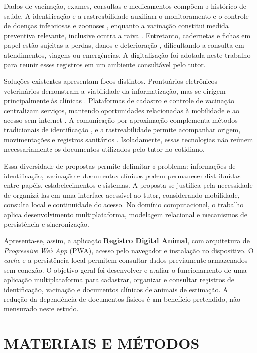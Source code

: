 \documentclass{UNESC}
\begin{document}
Dados de vacinação, exames, consultas e medicamentos compõem o histórico de saúde. A identificação e a rastreabilidade auxiliam o monitoramento e o controle de doenças infecciosas e zoonoses \cite{murphy2008}, enquanto a vacinação constitui medida preventiva relevante, inclusive contra a raiva \cite{MOUTINHO2017}. Entretanto, cadernetas e fichas em papel estão sujeitas a perdas, danos e deterioração \cite{BOLSON2022}, dificultando a consulta em atendimentos, viagens ou emergências. A digitalização foi adotada neste trabalho para reunir esses registros em um ambiente consultável pelo tutor.

Soluções existentes apresentam focos distintos. Prontuários eletrônicos veterinários demonstram a viabilidade da informatização, mas se dirigem principalmente às clínicas \cite{iskandar2023}. Plataformas de cadastro e controle de vacinação centralizam serviços, mantendo oportunidades relacionadas à mobilidade e ao acesso sem internet \cite{vieira2025}. A comunicação por aproximação complementa métodos tradicionais de identificação \cite{sartori2018}, e a rastreabilidade permite acompanhar origem, movimentações e registros sanitários \cite{zhao2020}. Isoladamente, essas tecnologias não reúnem necessariamente os documentos utilizados pelo tutor no cotidiano.

Essa diversidade de propostas permite delimitar o problema: informações de identificação, vacinação e documentos clínicos podem permanecer distribuídas entre papéis, estabelecimentos e sistemas. A proposta se justifica pela necessidade de organizá-las em uma interface acessível ao tutor, considerando mobilidade, consulta local e continuidade do acesso. No domínio computacional, o trabalho aplica desenvolvimento multiplataforma, modelagem relacional e mecanismos de persistência e sincronização.

Apresenta-se, assim, a aplicação \textbf{Registro Digital Animal}, com arquitetura de \textit{Progressive Web App} (PWA), acesso pelo navegador e instalação no dispositivo. O \textit{cache} e a persistência local permitem consultar dados previamente armazenados sem conexão. O objetivo geral foi desenvolver e avaliar o funcionamento de uma aplicação multiplataforma para cadastrar, organizar e consultar registros de identificação, vacinação e documentos clínicos de animais de estimação. A redução da dependência de documentos físicos é um benefício pretendido, não mensurado neste estudo.

\section{MATERIAIS E MÉTODOS}
\end{document}
